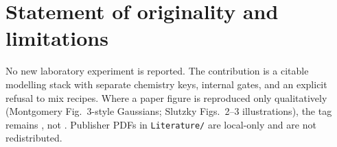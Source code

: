 \section{Statement of originality and limitations}

No new laboratory experiment is reported.
The contribution is a citable modelling stack with separate chemistry keys, internal gates, and an explicit refusal to mix recipes.
Where a paper figure is reproduced only qualitatively (Montgomery Fig.~3-style Gaussians; Slutzky Figs.~2--3 illustrations), the tag remains \tagvalid, not \tagmatch.
Publisher PDFs in \texttt{Literature/} are local-only and are not redistributed.
